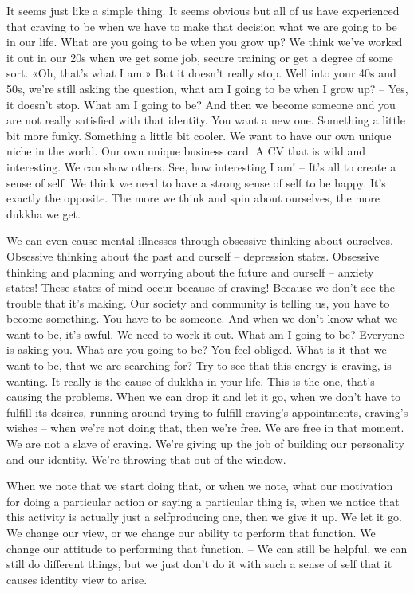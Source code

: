 \documentclass[letterpaper,10pt,english]{sphinxmanual}
\begin{document}
\sphinxAtStartPar
It seems just like a simple thing. It seems obvious but all of us have
experienced that craving to be when we have to make that decision what we
are going to be in our life. What are you going to be when you grow up? We
think we’ve worked it out in our 20s when we get some job, secure training
or get a degree of some sort. «Oh, that’s what I am.» But it doesn’t really
stop. Well into your 40s and 50s, we’re still asking the question, what am
I going to be when I grow up? – Yes, it doesn’t stop. What am I going to
be? And then we become someone and you are not really satisfied with that
identity. You want a new one. Something a little bit more funky. Something
a little bit cooler. We want to have our own unique niche in the world. Our
own unique business card. A CV that is wild and interesting. We can show
others. See, how interesting I am! – It’s all to create a sense of self. We think
we need to have a strong sense of self to be happy. It’s exactly the opposite.
The more we think and spin about ourselves, the more dukkha we get.

\sphinxAtStartPar
We can even cause mental illnesses through obsessive thinking about
ourselves. Obsessive thinking about the past and ourself – depression states.
Obsessive thinking and planning and worrying about the future and ourself
– anxiety states! These states of mind occur because of craving! Because we
don’t see the trouble that it’s making. Our society and community is telling
us, you have to become something. You have to be someone. And when we
don’t know what we want to be, it’s awful. We need to work it out. What am
I going to be? Everyone is asking you. What are you going to be? You feel
obliged. What is it that we want to be, that we are searching for? Try to see
that this energy is craving, is wanting. It really is the cause of dukkha in your
life. This is the one, that’s causing the problems. When we can drop it and
let it go, when we don’t have to fulfill its desires, running around trying to
fulfill craving’s appointments, craving’s wishes – when we’re not doing that,
then we’re free. We are free in that moment. We are not a slave of craving.
We’re giving up the job of building our personality and our identity. We’re
throwing that out of the window.

\sphinxAtStartPar
{}  When  we  note  that  we  start  doing  that,  or  when  we  note,  what  our
motivation for doing a particular action or saying a particular thing is, when
we notice that this activity is actually just a self\sphinxhyphen{}producing one, then we give
it up. We let it go. We change our view, or we change our ability to perform
that function. We change our attitude to performing that function. – We can
still be helpful, we can still do different things, but we just don’t do it with
such a sense of self that it causes identity view to arise.
\end{document}
